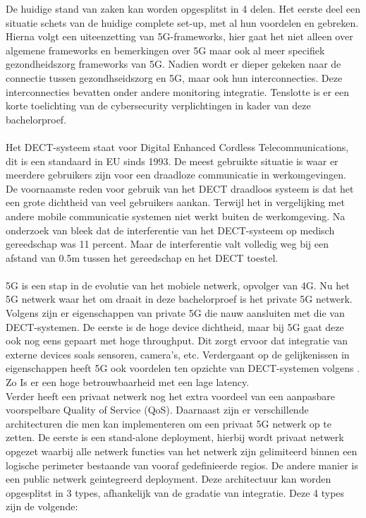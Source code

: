 De huidige stand van zaken kan worden opgesplitst in 4 delen. Het eerste deel een situatie schets van de huidige complete set-up, met al hun voordelen en gebreken. Hierna volgt een uiteenzetting van 5G-frameworks, hier gaat het niet alleen over algemene frameworks en bemerkingen over 5G maar ook al meer specifiek gezondheidszorg frameworks van 5G. Nadien wordt er dieper gekeken naar de connectie tussen gezondhseidszorg en 5G, maar ook hun interconnecties. Deze interconnecties bevatten onder andere monitoring integratie. Tenslotte is er een korte toelichting van de cybersecurity verplichtingen in kader van deze bachelorproef.
\\\\
Het DECT-systeem staat voor Digital Enhanced Cordless Telecommunications, dit is een standaard in EU sinds 1993. De meest gebruikte situatie is waar er meerdere gebruikers zijn voor een draadloze communicatie in werkomgevingen. De voornaamste reden voor gebruik van het DECT draadloos systeem is dat het een grote dichtheid van veel gebruikers aankan. Terwijl het in vergelijking met andere mobile communicatie systemen niet werkt buiten de werkomgeving.\autocite{Welinder1997} Na onderzoek van \textcite{Welinder1997} bleek dat de interferentie van het DECT-systeem op medisch gereedschap  was 11 percent. Maar de interferentie valt volledig weg bij een afstand van 0.5m tussen het gereedschap en het DECT toestel.
\\\\
5G is een stap in de evolutie van het mobiele netwerk, opvolger van 4G. Nu het 5G netwerk waar het om draait in deze bachelorproef is het private 5G netwerk. Volgens \textcite{wen2021private} zijn er eigenschappen van private 5G die nauw aansluiten met die van DECT-systemen. De eerste is de hoge device dichtheid, maar bij 5G gaat deze ook nog eens gepaart met hoge throughput. Dit zorgt ervoor dat integratie van externe devices soals sensoren, camera's, etc. Verdergaant op de gelijkenissen in eigenschappen heeft 5G ook voordelen ten opzichte van DECT-systemen volgens \textcite{wen2021private}. Zo Is er een hoge betrouwbaarheid met een lage latency.\\ Verder heeft een privaat netwerk nog het extra voordeel van een aanpasbare voorspelbare Quality of Service (QoS). Daarnaast zijn er verschillende architecturen die men kan implementeren om een privaat 5G netwerk op te zetten. De eerste is een stand-alone deployment, hierbij wordt privaat netwerk opgezet waarbij alle netwerk functies van het netwerk zijn gelimiteerd binnen een logische perimeter bestaande van vooraf gedefinieerde regios. De andere manier is een public netwerk geintegreerd deployment. Deze architectuur kan worden opgesplitst in 3 types, afhankelijk van de gradatie van integratie. Deze 4 types zijn de volgende:

